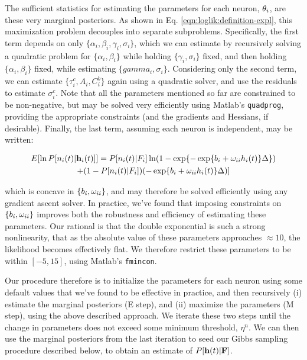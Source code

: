 The sufficient statistics for estimating the parameters for each neuron, $\mathbf{\theta}_i$, are these very marginal posteriors.  As shown in Eq. \eqref{eqn:loglik:definition-expl}, this maximization problem decouples into separate subproblems.  Specifically, the first term depends on only $\{\alpha_i, \beta_i, \gamma_i, \sigma_i\}$, which we can estimate by recursively solving a quadratic problem for $\{\alpha_i, \beta_i\}$ while holding $\{\gamma_i, \sigma_i\}$ fixed, and then holding $\{\alpha_i, \beta_i\}$ fixed, while estimating $\{gamma_i,\sigma_i\}$.  Considering only the second term, we can estimate $\{\tau_i^c, A_i, C_i^b\}$ again using a quadratic solver, and use the residuals to estimate $\sigma_i^c$.  Note that all the parameters mentioned so far are constrained to be non-negative, but may be solved very efficiently using Matlab's \texttt{quadprog}, providing the appropriate constraints (and the gradients and Hessians, if desirable).  Finally, the last term, assuming each neuron is independent, may be written:

\begin{multline} \label{eqn:bw}
	E [\ln P[n_i(t) | \mathbf{h}_i(t)]] = P[n_i(t) | F_i] \ln (1-\exp\{-\exp\{b_i + \omega_{ii} h_i(t)\}\Delta\})
	\\ +  (1-P[n_i(t) | F_i]) (-\exp\{b_i + \omega_{ii} h_i(t)\}\Delta)] 
\end{multline}

\noindent which is concave in $\{b_i, \omega_{ii}\}$, and may therefore be solved efficiently using any gradient ascent solver. In practice, we've found that imposing constraints on $\{b_i, \omega_{ii}\}$ improves both the robustness and efficiency of estimating these parameters.  Our rational is that the double exponential is such a strong nonlinearity, that as the absolute value of these parameters approaches $\approx 10$, the likelihood becomes effectively flat.  We therefore restrict these parameters to be within $[-5,15]$, using Matlab's \texttt{fmincon}.

Our procedure therefore is to initialize the parameters for each neuron using some default values that we've found to be effective in practice, and then recursively (i) estimate the marginal posteriors (E step), and (ii) maximize the parameters (M step), using the above described approach.  We iterate these two steps until the change in parameters does not exceed some minimum threshold, $\eta^n$.  We can then use the marginal posteriors from the last iteration to seed our Gibbs sampling procedure described below, to obtain an estimate of $P[\mathbf{h}(t) | {\bf F}]$.
